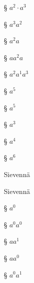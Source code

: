 \begin{tehtavasivu}
    \begin{tehtava}
       
§ $a^2\cdot a^3$
       
§ $a^3a^2$
       
§ $a^2 a$
       
§ $a a^2 a$
       
§ $a^2a^1a^3$
        
        \begin{vastaus}
           
§ $a^5$
           
§ $a^5$
           
§ $a^3$ 
           
§ $a^4$
           
§ $a^6$
        \end{vastaus}
    \end{tehtava}

\begin{tehtava}
  		Sievennä
        \begin{vastaus}
        \end{vastaus}
\end{tehtava}



\begin{tehtava}
  		Sievennä
        \begin{vastaus}
        \end{vastaus}
\end{tehtava}


    \begin{tehtava}
       
§ $a^0$
       
§ $a^0a^0$
       
§ $aa^1$
       
§ $aa^0$
       
§ $a^0a^1$
        
        \begin{vastaus}
           

\end{vastaus}
\end{tehtava}
\end{tehtavasivu}

